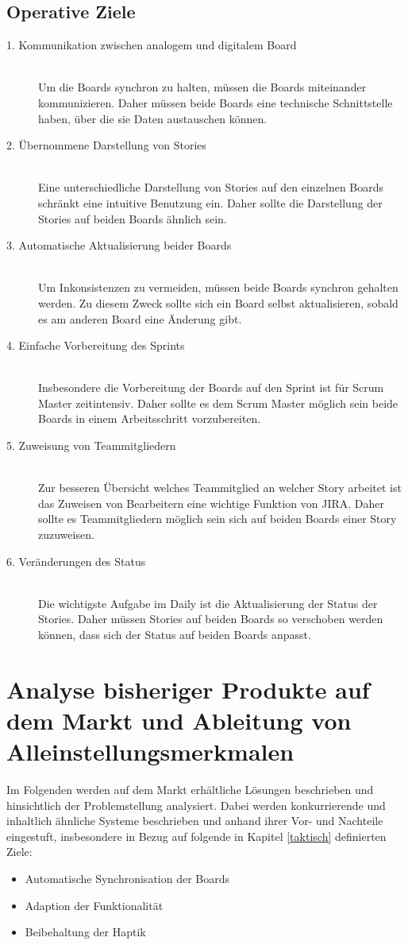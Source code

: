 \documentclass[12pt,titlepage]{scrartcl}
\begin{document}
		\subsection{Operative Ziele} \label{operativeZiele}
		\begin{description}
 			\item[1. Kommunikation zwischen analogem und digitalem Board] \hfill \\
 			Um die Boards synchron zu halten, müssen die Boards miteinander kommunizieren. Daher müssen beide Boards eine technische Schnittstelle haben, über die sie Daten austauschen können. 
 			\item[2. Übernommene Darstellung von Stories] \hfill \\
 			Eine unterschiedliche Darstellung von Stories auf den einzelnen Boards schränkt eine intuitive Benutzung ein. Daher sollte die Darstellung der Stories auf beiden Boards ähnlich sein.
 			\item[3. Automatische Aktualisierung beider Boards] \hfill \\
 			Um Inkonsistenzen zu vermeiden, müssen beide Boards synchron gehalten werden. Zu diesem Zweck sollte sich ein Board selbst aktualisieren, sobald es am anderen Board eine Änderung gibt.
 			\item[4. Einfache Vorbereitung des Sprints] \hfill \\
 			Insbesondere die Vorbereitung der Boards auf den Sprint ist für Scrum Master zeitintensiv. Daher sollte es dem Scrum Master möglich sein beide Boards in einem Arbeitsschritt vorzubereiten.
 			\item[5. Zuweisung von Teammitgliedern] \hfill \\
 			Zur besseren Übersicht welches Teammitglied an welcher Story arbeitet ist das Zuweisen von Bearbeitern eine wichtige Funktion von JIRA. Daher sollte es Teammitgliedern möglich sein sich auf beiden Boards einer Story zuzuweisen.
 			\item[6. Veränderungen des Status] \hfill \\
 			Die wichtigste Aufgabe im Daily ist die Aktualisierung der Status der Stories. Daher müssen Stories auf beiden Boards so verschoben werden können, dass sich der Status auf beiden Boards anpasst.
		\end{description}
	\newpage	
	\section{Analyse bisheriger Produkte auf dem Markt und Ableitung von Alleinstellungsmerkmalen} \label{markt}
	Im Folgenden werden auf dem Markt erhältliche Lösungen beschrieben und hinsichtlich der Problemstellung analysiert. Dabei werden konkurrierende und inhaltlich ähnliche Systeme beschrieben und anhand ihrer Vor- und Nachteile eingestuft, insbesondere in Bezug auf folgende in Kapitel \ref{taktisch} definierten Ziele:
	\begin{itemize} 
		\item Automatische Synchronisation der Boards 
		\item Adaption der Funktionalität
		\item Beibehaltung der Haptik 
	\end{itemize}
\end{document}
